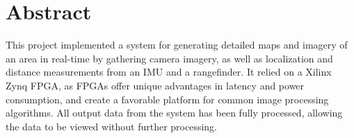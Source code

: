 {}
\section*{Abstract}
This project implemented a system for generating detailed maps and imagery of an area in real-time by gathering camera imagery, as well as localization and distance measurements from an IMU and a rangefinder. It relied on a Xilinx Zynq FPGA, as FPGAs offer unique advantages in latency and power consumption, and create a favorable platform for common image processing algorithms. All output data from the system has been fully processed, allowing the data to be viewed without further processing.